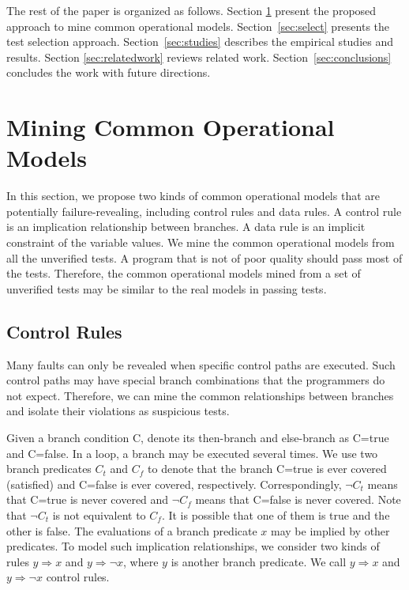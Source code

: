 \documentclass{sig-alternate}
\begin{document}
The rest of the paper is organized as follows. Section
\ref{sec:common} present the proposed approach to mine common
operational models. Section~\ref{sec:select} presents the test
selection approach.%
Section~\ref{sec:studies} describes the empirical studies and
results. Section \ref{sec:relatedwork} reviews related work.
Section~\ref{sec:conclusions} concludes the work with future
directions.








\section{Mining Common Operational Models} \label{sec:common}

In this section, we propose two kinds of common operational models
that are potentially failure-revealing, including control rules and
data rules. A control rule is an implication relationship between
branches. A data rule is an implicit constraint of the variable
values. We mine the common operational models from all the
unverified tests. A program that is not of poor quality should pass
most of the tests. Therefore, the common operational models mined
from a set of unverified tests may be similar to the real models in
passing tests.



\subsection{Control Rules}

Many faults can only be revealed when specific control paths are
executed. Such control paths may have special branch combinations
that the programmers do not expect. Therefore, we can mine the
common relationships between branches and isolate their violations
as suspicious tests.



Given a branch condition C, denote its then-branch and else-branch
as C=true and C=false. In a loop, a branch may be executed several
times. We use two branch predicates $C_t$ and $C_f$ to denote that
the branch C=true is ever covered (satisfied) and C=false is ever
covered, respectively. Correspondingly, $\neg C_t$ means that C=true
is never covered and $\neg C_f$ means that C=false is never covered.
Note that $\neg C_t$ is not equivalent to $C_f$. It is possible that
one of them is true and the other is false. The evaluations of a
branch predicate $x$ may be implied by other predicates. To model
such implication relationships, we consider two kinds of rules
$y\Rightarrow x$ and $y\Rightarrow \neg x$, where
$y$ is another branch predicate. %
We call $y\Rightarrow x$ and $y\Rightarrow \neg x$ control rules.
\end{document}
